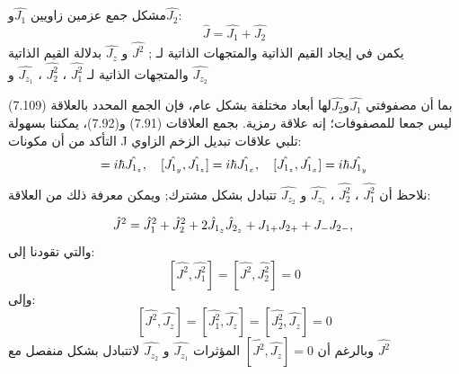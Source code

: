 مشكل جمع عزمين زاويين $\hat{J_1}$و$\hat{J_2}$:
\begin{equation*}
	\hat{J}=\hat{J_1}+\hat{J_2}
\end{equation*}
يكمن في إيجاد القيم الذاتية والمتجهات الذاتية لـ ;
$\hat{J^{2}}$ و $\hat{J_{z}}$
 بدلالة القيم الذاتية والمتجهات الذاتية لـ
  $\hat{J^{2}_1}$ ، 
 $\hat{J^{2}_2}$ ،
 $\hat{J_{z_1}}$
 و $\hat{J_{z_2}}$
 
بما أن مصفوفتي $\hat{J_1}$و$\hat{J_2}$لها أبعاد مختلفة بشكل عام، فإن الجمع المحدد بالعلاقة (7.109) ليس جمعا للمصفوفات؛ إنه علاقة رمزية. بجمع العلاقات (7.91) و(7.92)، يمكننا بسهولة التأكد من أن مكونات J تلبي علاقات تبديل الزخم الزاوي:
\begin{equation}
		[\hat{J_{1_x}}, \hat{J_{1_y}}] =  i\hbar \hat{J_{1_z}},  \\ \quad
	[\hat{J_{1_y}}, \hat{J_{1_z}}]  =  i\hbar \hat{J_{1_x}}, \\ \quad
	[\hat{J_{1_z}}, \hat{J_{1_x}}]  =  i\hbar \hat{J_{1_y}} 
\end{equation}
نلاحظ أن  
 $\hat{J^{2}_1}$ ، 
$\hat{J^{2}_2}$ ،
$\hat{J_{z_1}}$
و $\hat{J_{z_2}}$ تتبادل بشكل مشترك; ويمكن معرفة ذلك من العلاقة:

\begin{equation}
 \hat{J}^2=\hat{J}_1^2+\hat{J}^2_2+2 \hat{J}_{1_z} \hat{J}_{2_z}+J_{1+} J_{2+}+J_{-} J_{2-}, \\
 \end{equation}
والتي تقودنا إلى:
\begin{equation}
	\left[\hat{J^{2}}, \hat{J^{2}_1}\right]	=\left[\hat{J^{2}}, \hat{J^{2}_2}\right]=0
\end{equation}
وإلى:
\begin{equation}
\left[\hat{J^{2}}, \hat{J_z}\right] =\left[\hat{J^{2}_1}, \hat{J_z}\right]=\left[\hat{J^{2}_2}, \hat{J_z}\right]=0
\end{equation}
وبالرغم أن $	[\hat{J^{2}}, \hat{J_z}]=0 $
المؤثرات $\hat{J_{z_1}}$
و $\hat{J_{z_2}}$   لاتتبادل بشكل منفصل مع $\hat{J^{2}}$

